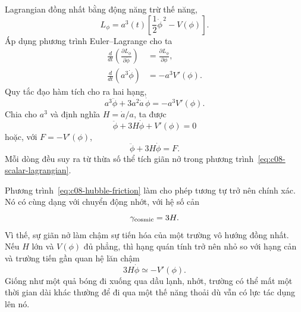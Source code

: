 Lagrangian đồng nhất bằng động năng trừ thế năng,
\begin{equation}
L_\phi=a^3(t)
\left[
\frac12\dot\phi^{\,2}-V(\phi)
\right].
\label{eq:c08-scalar-lagrangian}
\end{equation}
Áp dụng phương trình Euler--Lagrange cho ta
\begin{align}
\frac{d}{dt}\left(\frac{\partial L_\phi}{\partial\dot\phi}\right)
&=
\frac{\partial L_\phi}{\partial\phi},\\
\frac{d}{dt}\left(a^3\dot\phi\right)
&=-a^3V'(\phi).
\end{align}
Quy tắc đạo hàm tích cho ra hai hạng,
\begin{equation}
a^3\ddot\phi+3a^2\dot a\,\dot\phi
=-a^3V'(\phi).
\end{equation}
Chia cho \(a^3\) và định nghĩa \(H=\dot a/a\), ta được
\begin{equation}
\boxed{
\ddot\phi+3H\dot\phi+V'(\phi)=0
}
\label{eq:c08-hubble-friction}
\end{equation}
hoặc, với \(F=-V'(\phi)\),
\begin{equation}
\ddot\phi+3H\dot\phi=F.
\end{equation}
Mỗi dòng đều suy ra từ thừa số thể tích giãn nở trong phương trình~\eqref{eq:c08-scalar-lagrangian}.

\begin{classroomqa}
\end{classroomqa}

Phương trình~\eqref{eq:c08-hubble-friction} làm cho phép tương tự trở nên chính xác. Nó có cùng dạng với chuyển động nhớt, với hệ số cản
\begin{equation}
\gamma_{\rm cosmic}=3H.
\end{equation}
Vì thế, sự giãn nở làm chậm sự tiến hóa của một trường vô hướng đồng nhất. Nếu \(H\) lớn và \(V(\phi)\) đủ phẳng, thì hạng quán tính trở nên nhỏ so với hạng cản và trường tiến gần quan hệ lăn chậm
\begin{equation}
3H\dot\phi\simeq-V'(\phi).
\end{equation}
Giống như một quả bóng đi xuống qua dầu lạnh, nhớt, trường có thể mất một thời gian dài khác thường để đi qua một thế năng thoải dù vẫn có lực tác dụng lên nó.

